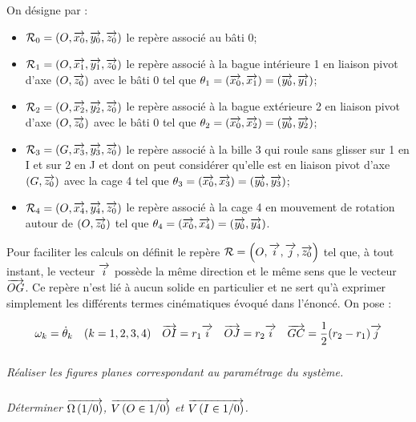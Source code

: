 \documentclass[10pt,oneside]{article}
\begin{document}
On désigne par :
\begin{itemize}
\item $\mathcal{R}_0 = \left(O,\overrightarrow{x_0},\overrightarrow{y_0},\overrightarrow{z_0}\right)$ le repère associé au bâti 0;
\item $\mathcal{R}_1 = \left(O,\overrightarrow{x_1},\overrightarrow{y_1},\overrightarrow{z_0}\right)$ le repère associé à la bague intérieure 1 en liaison pivot d'axe $(O,\overrightarrow{z_0})$ avec le bâti 0 tel que $\theta_1 = \left(\overrightarrow{x_0},\overrightarrow{x_1}\right) = \left(\overrightarrow{y_0},\overrightarrow{y_1}\right)$;
\item $\mathcal{R}_2 = \left(O,\overrightarrow{x_2},\overrightarrow{y_2},\overrightarrow{z_0}\right)$ le repère associé à la bague extérieure 2 en liaison pivot d'axe $(O,\overrightarrow{z_0})$ avec le bâti 0 tel que $\theta_2 = \left(\overrightarrow{x_0},\overrightarrow{x_2}\right) = \left(\overrightarrow{y_0},\overrightarrow{y_2}\right)$;
\item $\mathcal{R}_3 = \left(G,\overrightarrow{x_3},\overrightarrow{y_3},\overrightarrow{z_0}\right)$ le repère associé à la bille 3 qui roule sans glisser sur 1 en I et sur 2 en J et dont on peut considérer qu'elle est en liaison pivot d'axe $(G,\overrightarrow{z_0})$ avec la cage 4 tel que $\theta_3 = \left(\overrightarrow{x_0},\overrightarrow{x_3}\right) = \left(\overrightarrow{y_0},\overrightarrow{y_3}\right)$;
\item $\mathcal{R}_4 = \left(O,\overrightarrow{x_4},\overrightarrow{y_4},\overrightarrow{z_0}\right)$ le repère associé à la cage 4 en mouvement de rotation autour de $(O,\overrightarrow{z_0})$ tel que $\theta_4 = \left(\overrightarrow{x_0},\overrightarrow{x_4}\right) = \left(\overrightarrow{y_0},\overrightarrow{y_4}\right)$.
\end{itemize}

Pour faciliter les calculs on définit le repère $\mathcal{R}=\left(O,\overrightarrow{i},\overrightarrow{j},\overrightarrow{z_0} \right)$ tel que, à tout instant, le vecteur $\overrightarrow{i}$ possède la même direction et le même sens que le vecteur $\overrightarrow{OG}$. Ce repère n'est lié à aucun solide en particulier et ne sert qu'à exprimer simplement les différents termes cinématiques évoqué dans l'énoncé. On pose :

$$
\omega_k = \dot{\theta}_k \quad (k=1,2,3,4) \quad \overrightarrow{OI}=r_1 \overrightarrow{i} \quad \overrightarrow{OJ}=r_2\overrightarrow{i} \quad \overrightarrow{GC}=\dfrac{1}{2}(r_2-r_1)\overrightarrow{j}
$$

\subparagraph{}
\textit{Réaliser les figures planes correspondant au paramétrage du système.}

\subparagraph{}
\textit{Déterminer $\overrightarrow{\Omega\left( {1}/{0}\right)}$,  $\overrightarrow{V\left( {O} \in {1}/{0}\right)}$ et $\overrightarrow{V\left( {I} \in {1}/{0}\right)}$.}

\end{document}
